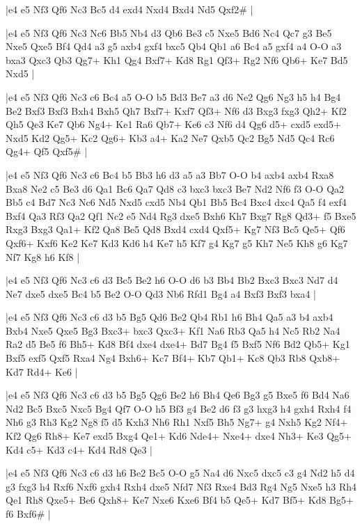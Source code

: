 \whitename{}
\blackname{}
\makegametitle
|e4 e5 Nf3 Qf6 Nc3 Bc5 d4 exd4 Nxd4 Bxd4 Nd5 Qxf2\#  |

\whitename{}
\blackname{}
\makegametitle
|e4 e5 Nf3 Qf6 Nc3 Nc6 Bb5 Nb4 d3 Qb6 Be3 c5 Nxe5 Bd6 Nc4 Qc7 g3 Be5 Nxe5 Qxe5 Bf4 Qd4 a3 g5 axb4 gxf4 bxc5 Qb4 Qb1 a6 Bc4 a5 gxf4 a4 O-O a3 bxa3 Qxc3 Qb3 Qg7+ Kh1 Qg4 Bxf7+ Kd8 Rg1 Qf3+ Rg2 Nf6 Qb6+ Ke7 Bd5 Nxd5  |

\whitename{}
\blackname{}
\makegametitle
|e4 e5 Nf3 Qf6 Nc3 c6 Bc4 a5 O-O b5 Bd3 Be7 a3 d6 Ne2 Qg6 Ng3 h5 h4 Bg4 Be2 Bxf3 Bxf3 Bxh4 Bxh5 Qh7 Bxf7+ Kxf7 Qf3+ Nf6 d3 Bxg3 fxg3 Qh2+ Kf2 Qh5 Qe3 Ke7 Qb6 Ng4+ Ke1 Ra6 Qb7+ Ke6 c3 Nf6 d4 Qg6 d5+ cxd5 exd5+ Nxd5 Kd2 Qg5+ Kc2 Qg6+ Kb3 a4+ Ka2 Ne7 Qxb5 Qc2 Bg5 Nd5 Qc4 Rc6 Qg4+ Qf5 Qxf5\#  |

\whitename{}
\blackname{}
\makegametitle
|e4 e5 Nf3 Qf6 Nc3 c6 Bc4 b5 Bb3 h6 d3 a5 a3 Bb7 O-O b4 axb4 axb4 Rxa8 Bxa8 Ne2 c5 Be3 d6 Qa1 Bc6 Qa7 Qd8 c3 bxc3 bxc3 Be7 Nd2 Nf6 f3 O-O Qa2 Bb5 c4 Bd7 Nc3 Nc6 Nd5 Nxd5 cxd5 Nb4 Qb1 Bb5 Bc4 Bxc4 dxc4 Qa5 f4 exf4 Bxf4 Qa3 Rf3 Qa2 Qf1 Nc2 e5 Nd4 Rg3 dxe5 Bxh6 Kh7 Bxg7 Rg8 Qd3+ f5 Bxe5 Rxg3 Bxg3 Qa1+ Kf2 Qa8 Be5 Qd8 Bxd4 cxd4 Qxf5+ Kg7 Nf3 Bc5 Qe5+ Qf6 Qxf6+ Kxf6 Ke2 Ke7 Kd3 Kd6 h4 Ke7 h5 Kf7 g4 Kg7 g5 Kh7 Ne5 Kh8 g6 Kg7 Nf7 Kg8 h6 Kf8  |

\whitename{}
\blackname{}
\makegametitle
|e4 e5 Nf3 Qf6 Nc3 c6 d3 Bc5 Be2 h6 O-O d6 b3 Bb4 Bb2 Bxc3 Bxc3 Nd7 d4 Ne7 dxe5 dxe5 Bc4 b5 Be2 O-O Qd3 Nb6 Rfd1 Bg4 a4 Bxf3 Bxf3 bxa4  |

\whitename{}
\blackname{}
\makegametitle
|e4 e5 Nf3 Qf6 Nc3 c6 d3 b5 Bg5 Qd6 Be2 Qb4 Rb1 h6 Bh4 Qa5 a3 b4 axb4 Bxb4 Nxe5 Qxe5 Bg3 Bxc3+ bxc3 Qxc3+ Kf1 Na6 Rb3 Qa5 h4 Nc5 Rb2 Na4 Ra2 d5 Be5 f6 Bh5+ Kd8 Bf4 dxe4 dxe4+ Bd7 Bg4 f5 Bxf5 Nf6 Bd2 Qb5+ Kg1 Bxf5 exf5 Qxf5 Rxa4 Ng4 Bxh6+ Kc7 Bf4+ Kb7 Qb1+ Kc8 Qb3 Rb8 Qxb8+ Kd7 Rd4+ Ke6  |

\whitename{}
\blackname{}
\makegametitle
|e4 e5 Nf3 Qf6 Nc3 c6 d3 b5 Bg5 Qg6 Be2 h6 Bh4 Qe6 Bg3 g5 Bxe5 f6 Bd4 Na6 Nd2 Bc5 Bxc5 Nxc5 Bg4 Qf7 O-O h5 Bf3 g4 Be2 d6 f3 g3 hxg3 h4 gxh4 Rxh4 f4 Nh6 g3 Rh3 Kg2 Ng8 f5 d5 Kxh3 Nh6 Rh1 Nxf5 Bh5 Ng7+ g4 Nxh5 Kg2 Nf4+ Kf2 Qg6 Rh8+ Ke7 exd5 Bxg4 Qe1+ Kd6 Nde4+ Nxe4+ dxe4 Nh3+ Ke3 Qg5+ Kd4 c5+ Kd3 c4+ Kd4 Rd8 Qe3  |

\whitename{}
\blackname{}
\makegametitle
|e4 e5 Nf3 Qf6 Nc3 c6 d3 h6 Be2 Bc5 O-O g5 Na4 d6 Nxc5 dxc5 c3 g4 Nd2 h5 d4 g3 fxg3 h4 Rxf6 Nxf6 gxh4 Rxh4 dxe5 Nfd7 Nf3 Rxe4 Bd3 Rg4 Ng5 Nxe5 h3 Rh4 Qe1 Rh8 Qxe5+ Be6 Qxh8+ Ke7 Nxe6 Kxe6 Bf4 b5 Qe5+ Kd7 Bf5+ Kd8 Bg5+ f6 Bxf6\#  |

